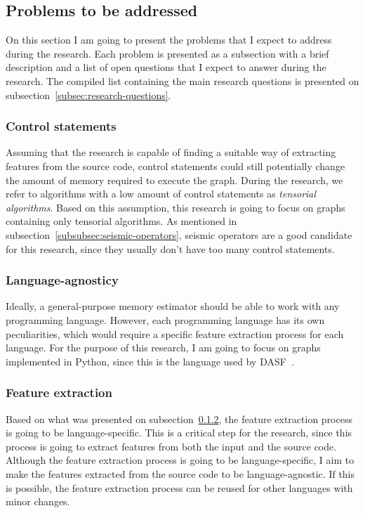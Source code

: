 \subsection{Problems to be addressed}
\label{subsec:problems-to-be-addressed}

On this section I am going to present the problems that I expect to address during the research.
Each problem is presented as a subsection with a brief description and a list of open questions that I expect to answer during the research.
The compiled list containing the main research questions is presented on subsection~\ref{subsec:research-questions}.

\subsubsection{Control statements}

Assuming that the research is capable of finding a suitable way of extracting features from the source code, control statements could still potentially change the amount of memory required to execute the graph.
During the research, we refer to algorithms with a low amount of control statements as \textit{tensorial algorithms}.
Based on this assumption, this research is going to focus on graphs containing only tensorial algorithms.
As mentioned in subsection~\ref{subsubsec:seismic-operators}, seismic operators are a good candidate for this research, since they usually don't have too many control statements.

\subsubsection{Language-agnosticy}
\label{subsubsec:language-agnosticy}

Ideally, a general-purpose memory estimator should be able to work with any programming language.
However, each programming language has its own peculiarities, which would require a specific feature extraction process for each language.
For the purpose of this research, I am going to focus on graphs implemented in Python, since this is the language used by DASF~\cite{dasf}.

\subsubsection{Feature extraction}

Based on what was presented on subsection~\ref{subsubsec:language-agnosticy}, the feature extraction process is going to be language-specific.
This is a critical step for the research, since this process is going to extract features from both the input and the source code.
Although the feature extraction process is going to be language-specific, I aim to make the features extracted from the source code to be language-agnostic.
If this is possible, the feature extraction process can be reused for other languages with minor changes.

